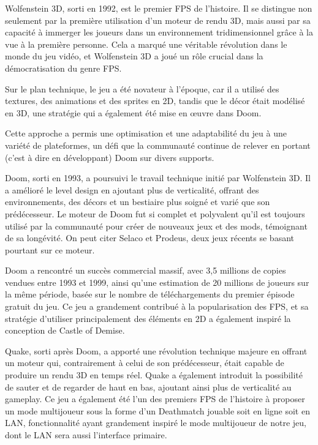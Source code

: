 \documentclass{report}
\begin{document}
Wolfenstein 3D, sorti en 1992, est le premier FPS de l’histoire. Il se distingue non seulement par la première utilisation d’un moteur de rendu 3D, mais aussi par sa capacité à immerger les joueurs dans un environnement tridimensionnel grâce à la vue à la
première personne. Cela a marqué une véritable révolution dans le monde du jeu vidéo,
et Wolfenstein 3D a joué un rôle crucial dans la démocratisation du genre FPS. \newline

Sur le plan technique, le jeu a été novateur à l’époque, car il a utilisé des textures, des animations et des sprites en 2D, tandis que le décor était modélisé en 3D, une stratégie qui a également été mise en œuvre dans Doom. \newline

Cette approche a permis une optimisation et une adaptabilité du jeu à une variété de plateformes, un défi que la communauté continue de relever en portant (c’est à dire en développant) Doom sur divers supports. \newline

Doom, sorti en 1993, a poursuivi le travail technique initié par Wolfenstein 3D. Il a amélioré le level design en ajoutant plus de verticalité, offrant des environnements, des décors et un bestiaire plus soigné et varié que son prédécesseur. Le moteur de Doom fut si complet et polyvalent qu’il est toujours utilisé par la communauté pour créer de nouveaux jeux et des mods, témoignant de sa longévité. On peut citer Selaco et Prodeus, deux jeux récents se basant pourtant sur ce moteur. \newline

Doom a rencontré un succès commercial massif, avec 3,5 millions de copies vendues entre 1993 et 1999, ainsi qu’une estimation de 20 millions de joueurs sur la même période, basée sur le nombre de téléchargements du premier épisode gratuit du jeu. Ce jeu a grandement contribué à la popularisation des FPS, et sa stratégie d’utiliser principalement des éléments en 2D a également inspiré la conception de Castle of Demise. \newline

Quake, sorti après Doom, a apporté une révolution technique majeure en offrant
un moteur qui, contrairement à celui de son prédécesseur, était capable de produire un rendu 3D en temps réel. Quake a également introduit la possibilité de sauter et de regarder de haut en bas, ajoutant ainsi plus de verticalité au gameplay. Ce jeu a également été l’un
des premiers FPS de l’histoire à proposer un mode multijoueur sous la forme d’un Deathmatch jouable soit en ligne soit en LAN, fonctionnalité ayant grandement inspiré le mode multijoueur de notre jeu, dont le LAN sera aussi l’interface primaire. \newline
\end{document}
